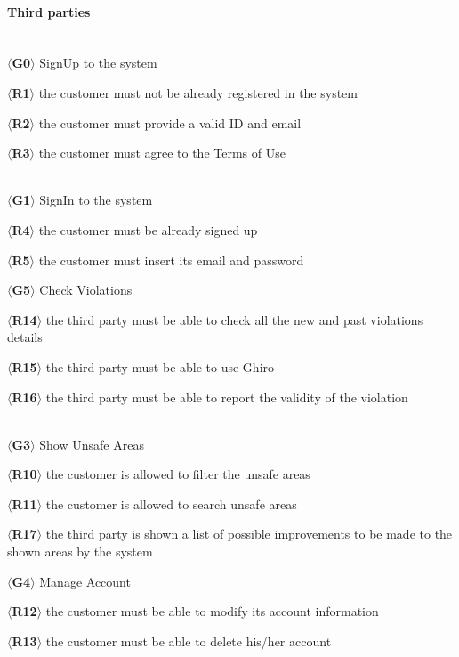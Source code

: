 \documentclass{article}
\begin{document}
\paragraph{Third parties}\mbox{}\\
$\langle$\textbf{G0}$\rangle$ SignUp to the system
\begin{description}
    \item $\langle$\textbf{R1}$\rangle$ the customer must not be already
    registered  in the system
    \item $\langle$\textbf{R2}$\rangle$ the customer must provide a valid ID and
    email
    \item $\langle$\textbf{R3}$\rangle$ the customer must agree to the Terms of
Use \end{description}\mbox{}\\
$\langle$\textbf{G1}$\rangle$ SignIn to the system
\begin{description}
    \item $\langle$\textbf{R4}$\rangle$ the customer must be already signed up
    \item $\langle$\textbf{R5}$\rangle$ the customer must insert its email and
    password\\
\end{description}
$\langle$\textbf{G5}$\rangle$ Check Violations
\begin{description}
    \item $\langle$\textbf{R14}$\rangle$ the third party must be able to check
    all the new and past violations details
    \item $\langle$\textbf{R15}$\rangle$ the third party must be able to use
    Ghiro
    \item $\langle$\textbf{R16}$\rangle$ the third party must be able to report
    the validity of the violation \end{description}\mbox{}\\
$\langle$\textbf{G3}$\rangle$ Show Unsafe Areas
\begin{description}
    \item $\langle$\textbf{R10}$\rangle$ the customer is allowed to filter the
    unsafe areas
    \item $\langle$\textbf{R11}$\rangle$ the customer is allowed to search
    unsafe areas 
    \item $\langle$\textbf{R17}$\rangle$ the third party is shown a list of
    possible improvements to be made to the shown areas by the system
\end{description}
$\langle$\textbf{G4}$\rangle$ Manage Account
\begin{description}
    \item $\langle$\textbf{R12}$\rangle$ the customer must be able to modify its
    account information
    \item $\langle$\textbf{R13}$\rangle$ the customer must be able to delete
    his/her account
\end{description}  
\newpage  
\end{document}
